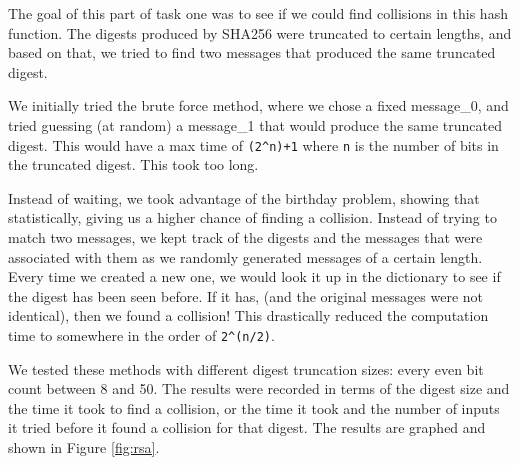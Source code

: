 \documentclass[11pt]{article}
\begin{document}
The goal of this part of task one was to see if we could find collisions in this hash function. The digests produced by SHA256 were truncated to certain lengths, and based on that, we tried to find two messages that produced the same truncated digest. 

We initially tried the brute force method, where we chose a fixed message\_0, and tried guessing (at random) a message\_1 that would produce the same truncated digest. This would have a max time of \verb|(2^n)+1| where \verb|n| is the number of bits in the truncated digest. This took too long. 

Instead of waiting, we took advantage of the birthday problem, showing that statistically, giving us a higher chance of finding a collision. Instead of trying to match two messages, we kept track of the digests and the messages that were associated with them as we randomly generated messages of a certain length. Every time we created a new one, we would look it up in the dictionary to see if the digest has been seen before. If it has, (and the original messages were not identical), then we found a collision! This drastically reduced the computation time to somewhere in the order of \verb|2^(n/2)|.

We tested these methods with different digest truncation sizes: every even bit count between 8 and 50. The results were recorded in terms of the digest size and the time it took to find a collision, or the time it took and the number of inputs it tried before it found a collision for that digest. The results are graphed and shown in Figure \ref{fig:rsa}.
\end{document}
